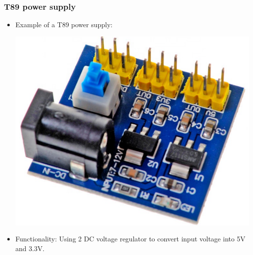 \documentclass[12pt]{article}
\begin{document}
        \subsubsection{T89 power supply}
            \begin{itemize}
                \item Example of a T89 power supply:
                \begin{center}
                    \includegraphics[scale = 0.25]{./images/t89.png}
                \end{center}

                \item Functionality: Using 2 DC voltage regulator to convert input voltage into 5V and 3.3V.
            \end{itemize}
    \newpage
\end{document}
